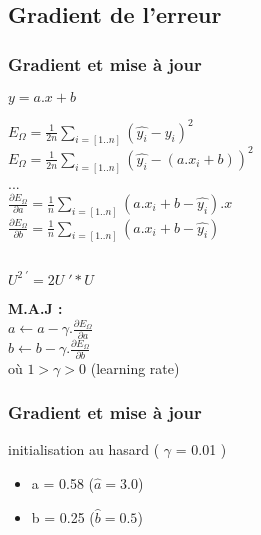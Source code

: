 \subsection{Gradient de l'erreur}

\begin{frame}
  \frametitle{Gradient et mise à jour}
  \begin{minipage}[l]{0.49\linewidth}
    \begin{center}
      $\boxed{y = a.x+b}$ \\
    \end{center}
    $E_{\Omega} = \frac{1}{2n}\underset{i=[1..n]}{\sum}( \hat{y_i} - y_i )^2$ \\
    $E_{\Omega} = \frac{1}{2n}\underset{i=[1..n]}{\sum}( \hat{y_i} - (a.x_i+b) )^2$ \\
    ... \\
    $\frac{\partial{E_{\Omega}}}{\partial{a}} = \frac{1}{n}\sum_{i=[1..n]}(a.x_i+b - \hat{y_i}).x$ \\
    $\frac{\partial{E_{\Omega}}}{\partial{b}} = \frac{1}{n}\sum_{i=[1..n]}(a.x_i+b - \hat{y_i})$ \\
  \end{minipage}\hfill
  \begin{minipage}[c]{0.49\linewidth}
    $\;$ \\
    $\;$ \\
    $\;$ \\
    \begin{center}
      $\boxed{U^{2\;\prime}=2U\;'*U}$
    \end{center}
  \end{minipage}\hfill
  \begin{center}
    \textbf{M.A.J :} \\
    $\;$ \\
    $a \leftarrow a - \gamma.\frac{\partial{E_{\Omega}}}{\partial{a}}$ \\
    $b \leftarrow b - \gamma.\frac{\partial{E_{\Omega}}}{\partial{b}}$ \\
    $\;$ \\
    où $1 > \gamma > 0$ (learning rate)
  \end{center}
\end{frame}

\begin{frame}
  \frametitle{Gradient et mise à jour}
  initialisation au hasard ( $\gamma$ = 0.01 )
  \begin{itemize}
  \item a = 0.58 ($\hat{a} = 3.0$)
  \item b = 0.25 ($\hat{b} = 0.5$)
  \end{itemize}
\end{frame}

